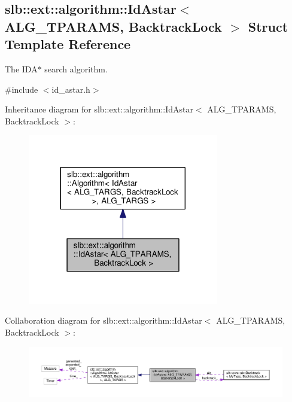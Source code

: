 \hypertarget{structslb_1_1ext_1_1algorithm_1_1IdAstar}{}\subsection{slb\+:\+:ext\+:\+:algorithm\+:\+:Id\+Astar$<$ A\+L\+G\+\_\+\+T\+P\+A\+R\+A\+MS, Backtrack\+Lock $>$ Struct Template Reference}
\label{structslb_1_1ext_1_1algorithm_1_1IdAstar}


The {\ttfamily I\+D\+A$\ast$} search algorithm.  




{\ttfamily \#include $<$id\+\_\+astar.\+h$>$}



Inheritance diagram for slb\+:\+:ext\+:\+:algorithm\+:\+:Id\+Astar$<$ A\+L\+G\+\_\+\+T\+P\+A\+R\+A\+MS, Backtrack\+Lock $>$\+:\nopagebreak
\begin{figure}[H]
\begin{center}
\leavevmode
\includegraphics[width=236pt]{structslb_1_1ext_1_1algorithm_1_1IdAstar__inherit__graph}
\end{center}
\end{figure}


Collaboration diagram for slb\+:\+:ext\+:\+:algorithm\+:\+:Id\+Astar$<$ A\+L\+G\+\_\+\+T\+P\+A\+R\+A\+MS, Backtrack\+Lock $>$\+:\nopagebreak
\begin{figure}[H]
\begin{center}
\leavevmode
\includegraphics[width=350pt]{structslb_1_1ext_1_1algorithm_1_1IdAstar__coll__graph}
\end{center}
\end{figure}
